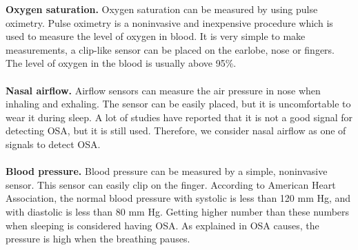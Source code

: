     \textbf{Oxygen saturation. } Oxygen saturation can be measured by using pulse oximetry. Pulse oximetry is a noninvasive and inexpensive procedure which is used to measure the level of oxygen in blood. It is very simple to make measurements, a clip-like sensor can be placed on the earlobe, nose or fingers\cite{WIKIHOW}. The level of oxygen in the blood is usually above 95\%.\\\\
    \textbf{Nasal airflow. } Airflow sensors can measure the air pressure in nose when inhaling and exhaling. The sensor can be easily placed, but it is uncomfortable to wear it during sleep. A lot of studies have reported that it is not a good signal for detecting OSA, but it is still used\cite{HINDIWAAIRFLOW}. Therefore, we consider nasal airflow as one of signals to detect OSA.\\\\
    \textbf{Blood pressure. } Blood pressure can be measured by a simple, noninvasive sensor. This sensor can easily clip on the finger. According to American Heart Association\cite{HEARTORG}, the normal blood pressure with systolic is less than 120 mm Hg, and with diastolic is less than 80 mm Hg. Getting higher number than these numbers when sleeping is considered having OSA. As explained in OSA causes, the pressure is high when the breathing pauses.\\


